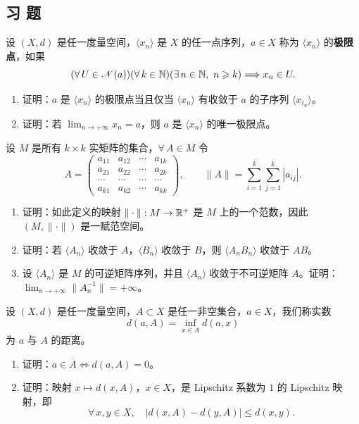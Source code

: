 \subsection*{习 题}

\begin{exercise}
	\item 设 $(X,d)$ 是任一度量空间，$\langle x_n\rangle$ 是 $X$ 的任一点序列，$a\in X$ 称为 $\langle x_n\rangle$ 的\textbf{极限点}，如果
	\[(\forall\,U\in\mathscr{N}(a))(\forall\,k\in\N)(\exists\,n\in\N,\ n\geqslant k)\Longrightarrow x_n\in U.\]
	\begin{enumerate}[label=\arabic*)]
		\item 证明：$a$ 是 $\langle x_n\rangle$ 的极限点当且仅当 $\langle x_n\rangle$ 有收敛于 $a$ 的子序列 $\langle x_{i_n}\rangle$。
		\item 证明：若 $\displaystyle\lim_{n\to+\infty}x_n=a$，则 $a$ 是 $\langle x_n\rangle$ 的唯一极限点。
	\end{enumerate}
\end{exercise}

\begin{exercise}
	\item 设 $M$ 是所有 $k\times k$ 实矩阵的集合，$\forall\,A\in M$ 令
	\[A=\begin{pmatrix} a_{11}&a_{12}&\cdots&a_{1k}\\ a_{21}&a_{22}&\cdots&a_{2k}\\ \cdots&\cdots&\cdots&\cdots\\ a_{k1}&a_{k2}&\cdots&a_{kk} \end{pmatrix},\qquad\|A\|=\sum_{i=1}^{k}\sum_{j=1}^{k}|a_{ij}|.\]
	\begin{enumerate}[label=\arabic*)]
		\item 证明：如此定义的映射 $\|\cdot\|:M\to\mathbb{R}^+$ 是 $M$ 上的一个范数，因此 $(M,\|\cdot\|)$ 是一赋范空间。
		\item 证明：若 $\langle A_n\rangle$ 收敛于 $A$，$\langle B_n\rangle$ 收敛于 $B$，则 $\langle A_nB_n\rangle$ 收敛于 $AB$。
		\item 设 $\langle A_n\rangle$ 是 $M$ 的可逆矩阵序列，并且 $\langle A_n\rangle$ 收敛于不可逆矩阵 $A$。证明：$\displaystyle\lim_{n\to+\infty}\|A_n^{-1}\|=+\infty$。
	\end{enumerate}
\end{exercise}

\begin{exercise}
	\item 设 $(X,d)$ 是任一度量空间，$A\subset X$ 是任一非空集合，$a\in X$，我们称实数
	\[d(a,A)=\inf_{x\in A}d(a,x)\]
	为 $a$ 与 $A$ 的距离。
	\begin{enumerate}[label=\arabic*)]
		\item 证明：$a\in\overline A\Longleftrightarrow d(a,A)=0$。
		\item 证明：映射 $x\longmapsto d(x,A)$，$x\in X$，是 Lipschitz 系数为 $1$ 的 Lipschitz 映射，即
		\[\forall\,x,y\in X,\quad|d(x,A)-d(y,A)|\leqslant d(x,y).\]
	\end{enumerate}
\end{exercise}

